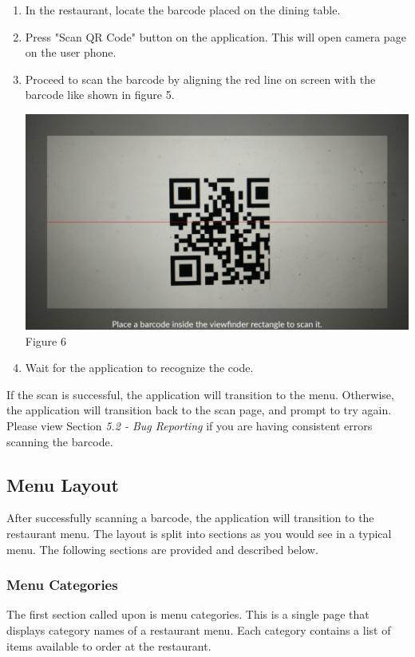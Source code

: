\documentclass[12pt, titlepage]{article}
\begin{document}
\begin{enumerate}
\item In the restaurant, locate the barcode placed on the dining table.
\item Press "Scan QR Code" button on the application. This will open camera page on the user phone. 
\item Proceed to scan the barcode by aligning the red line on screen with the barcode like shown in figure 5.
\begin{center}\includegraphics[scale=0.15]{scan.png}	\linebreak Figure 6 \end{center}
\item Wait for the application to recognize the code. 
\end{enumerate}

\noindent If the scan is successful, the application will transition to the menu. Otherwise, the application will transition back to the scan page, and prompt to try again. 
\newline\newline
Please view Section \emph{5.2 - Bug Reporting} if you are having consistent errors scanning the barcode. 

\subsection{Menu Layout}
After successfully scanning a barcode, the application will transition to the restaurant menu. The layout is split into sections as you would see in a typical menu. The following sections are provided and described below.

\subsubsection{Menu Categories}
The first section called upon is menu categories. This is a single page that displays category names of a restaurant menu. Each category contains a list of items available to order at the restaurant.
\end{document}

